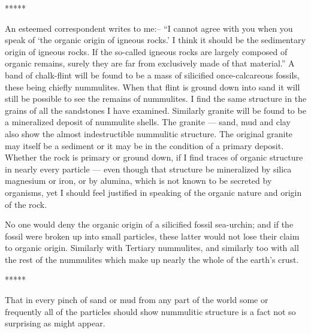 \documentclass[a4paper, 12pt, oneside, landscape]{article}
\begin{document}
\centerline{*\hspace{15mm}*\hspace{15mm}*\hspace{15mm}*\hspace{15mm}*}
\bigskip

An esteemed correspondent writes to me:-- ``I cannot agree with you when you speak of `the organic origin of igneous rocks.' I think it should be the sedimentary origin of igneous rocks. If the so-called igneous rocks are largely composed of organic remains, surely they are far from exclusively made of that material.'' A band of chalk-flint will be found to be a mass of silicified once-calcareous fossils, these being chiefly nummulites. When that flint is ground down into sand it will still be possible to see the remains of nummulites. I find the same structure in the grains of all the sandstones I have examined. Similarly granite will be found to be a mineralized deposit of nummulite shells. The granite --- sand, mud and clay also show the almost indestructible nummulitic structure. The original granite may itself be a sediment or it may be in the condition of a primary deposit. Whether the rock is primary or ground down, if I find traces of organic structure in nearly every particle --- even though that structure be mineralized by silica magnesium or iron, or by alumina, which is not known to be secreted by organisms, yet I should feel justified in speaking of the organic nature and origin of the rock.

No one would deny the organic origin of a silicified fossil sea-urchin; and if the fossil were broken up into small particles, these latter would not lose their claim to organic origin. Similarly with Tertiary nummulites, and similarly too with all the rest of the nummulites which make up nearly the whole of the earth's crust.

\centerline{*\hspace{15mm}*\hspace{15mm}*\hspace{15mm}*\hspace{15mm}*}
\bigskip

That in every pinch of sand or mud from any part of the world some or frequently all of the particles should show nummulitic structure is a fact not so surprising as might appear.
\end{document}
